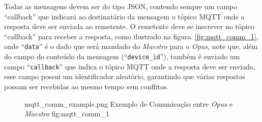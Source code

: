 Todas as mensagens devem ser do tipo JSON, contendo sempre um campo ``callback'' que indicará ao destinatário da mensagem o tópico MQTT
onde a resposta deve ser enviada ao remetente. O remetente deve se inscrever no tópico ``callback'' para receber a resposta, como ilustrado
na figura~\ref{fig:mqtt_comm_1}, onde ``\lstinline{data}'' é o dado que será mandado do \emph{Maestro} para o \emph{Opus}, note que, além do
campo do conteúdo da mensagem (``\lstinline{device_id}''), também é enviado um campo ``\lstinline{callback}'' que indica o tópico MQTT onde a resposta
deve ser enviada, esse campo possui um identificador aleatório, garantindo que várias respostas possam ser recebidas ao mesmo tempo sem conflitos.
\begin{figure}[h!]
    {mqtt_comm_example.png}
    {Exemplo de Comunicação entre \emph{Opus} e \emph{Maestro}}
    {fig:mqtt_comm_1}
\end{figure}


